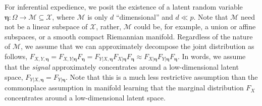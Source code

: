 \documentclass{article} %
\newcommand{\Real}{\mathbb{R}}
\providecommand{\mb}[1]{\boldsymbol{#1}}
\providecommand{\mc}[1]{\mathcal{#1}}
\newcommand{\from}{{\ensuremath{\colon}}}  %
\begin{document}
For inferential expedience, we  posit the existence of  a latent random variable $\mb{\eta} \from \Omega \to \mc{M} \subseteq \mc{X}$, where $\mc{M}$ is only $d$ ``dimensional'' and $d \ll p$.   
Note that $\mc{M}$ need not be a linear subspace of $\mc{X}$, rather, $\mc{M}$ could be, for example,  a union or affine subspaces, or a smooth compact Riemannian manifold.  Regardless of the nature of $\mc{M}$, we assume that we can approximately decompose the joint distribution as follows,  $F_{X,Y,\mb{\eta}}=F_{X,Y|\mb{\eta}}F_{\mb{\eta}} = F_{Y|X, \mb{\eta}} F_{X | \mb{\eta}} F_{\mb{\eta}} \approx F_{X|\mb{\eta}} F_{Y|\mb{\eta}} F_{\mb{\eta}}$.  In  words, we assume that the \emph{signal} approximately concentrates around a low-dimensional latent space, $F_{Y|X,\mb{\eta}}=F_{Y|\mb{\eta}}$.  Note that this is a much less restrictive assumption than the commonplace assumption in manifold learning that the marginal distribution $F_X$ concentrates around a low-dimensional latent space.  %


\end{document}
